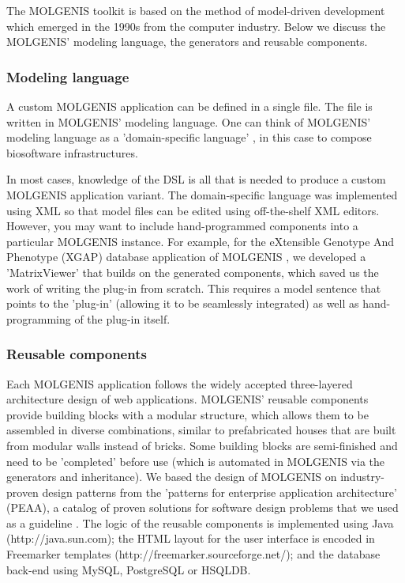 The MOLGENIS toolkit is based on the method of model-driven development which emerged in the 1990s 
from the computer industry. Below we discuss the MOLGENIS' modeling language, the generators and 
reusable components. 

\subsubsection{Modeling language}
A custom MOLGENIS application can be defined in a single file. The file is written in MOLGENIS' 
modeling language. One can think of MOLGENIS' modeling language as a 'domain-specific language' 
\cite{Deursen:2002}, in this case to compose biosoftware infrastructures.

In most cases, knowledge of the DSL is all that is needed to produce a custom MOLGENIS application 
variant. The domain-specific language was implemented using XML so that model files can be edited 
using off-the-shelf XML editors. However, you may want to include hand-programmed components into 
a particular MOLGENIS instance. For example, for the eXtensible Genotype And Phenotype (XGAP) 
database application of MOLGENIS \cite{Swertz:2010a}, we developed a 'MatrixViewer' that builds on the generated 
components, which saved us the work of writing the plug-in from scratch. This requires a model 
sentence that points to the 'plug-in' (allowing it to be seamlessly integrated) as well as 
hand-programming of the plug-in itself.

\subsubsection{Reusable components}
Each MOLGENIS application follows the widely accepted three-layered architecture design of web 
applications. MOLGENIS' reusable components provide building blocks with a modular structure, which 
allows them to be assembled in diverse combinations, similar to prefabricated houses that are built 
from modular walls instead of bricks. Some building blocks are semi-finished and need to be 
'completed' before use (which is automated in MOLGENIS via the generators and inheritance). We based 
the design of MOLGENIS on industry-proven design patterns from the 'patterns for enterprise 
application architecture' (PEAA), a catalog of proven solutions for software design problems 
that we used as a guideline \cite{Fowler:2002}. The logic of the reusable components is implemented using 
Java (http://java.sun.com); the HTML layout for the user interface is encoded in Freemarker 
templates (http://freemarker.sourceforge.net/); and the database back-end using MySQL, PostgreSQL 
or HSQLDB.

